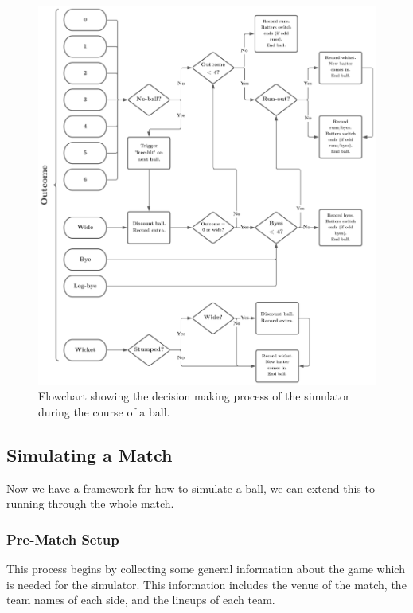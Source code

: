 \begin{figure}
    \centering
    \includegraphics[width=1\columnwidth]{images/cricket flowchart (2).png}
    \caption{Flowchart showing the decision making process of the simulator during the course of a ball.}
    \label{fig: flowchart}
\end{figure}

\newpage
\subsection{Simulating a Match}

Now we have a framework for how to simulate a ball, we can extend this to running through the whole match. 

\subsubsection{Pre-Match Setup}

This process begins by collecting some general information about the game which is needed for the simulator. This information includes the venue of the match, the team names of each side, and the lineups of each team. 

